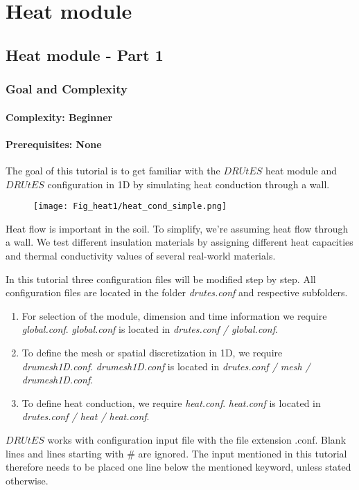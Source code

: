 
\chapter{Heat module}

\section{Heat module - Part 1}


\subsection{Goal and Complexity}
\subsubsection*{Complexity: Beginner}

\subsubsection*{Prerequisites: None}

The goal of this tutorial is to get familiar with the $DRUtES$ heat module and  $DRUtES$ configuration in 1D by simulating heat conduction through a wall.\medskip

\begin{figure}[!h]
\centering
\texttt{[image: Fig\_heat1/heat\_cond\_simple.png]}
\end{figure}
Heat flow is important in the soil. To simplify, we're assuming heat flow through a wall. We test different insulation materials by assigning different heat capacities and thermal conductivity values of several real-world materials. 

In this tutorial three configuration files will be modified step by step. All configuration files are located in the folder \emph{drutes.conf} and respective subfolders. \begin{enumerate}
\item For selection of the module, dimension and time information we require \emph{global.conf}.  \emph{global.conf} is located in \emph{drutes.conf / global.conf}. 
\item To define the mesh or spatial discretization in 1D,  we require \emph{drumesh1D.conf}. \emph{drumesh1D.conf} is located in \emph{drutes.conf / mesh / drumesh1D.conf}. 
\item To define heat conduction, we require \emph{heat.conf}. \emph{heat.conf} is located in \emph{drutes.conf / heat / heat.conf}. 
\end{enumerate}
$DRUtES$ works with configuration input file with the file extension .conf. Blank lines and lines starting with \# are ignored. The input mentioned in this tutorial therefore needs to be placed one line below the mentioned keyword, unless stated otherwise. 



